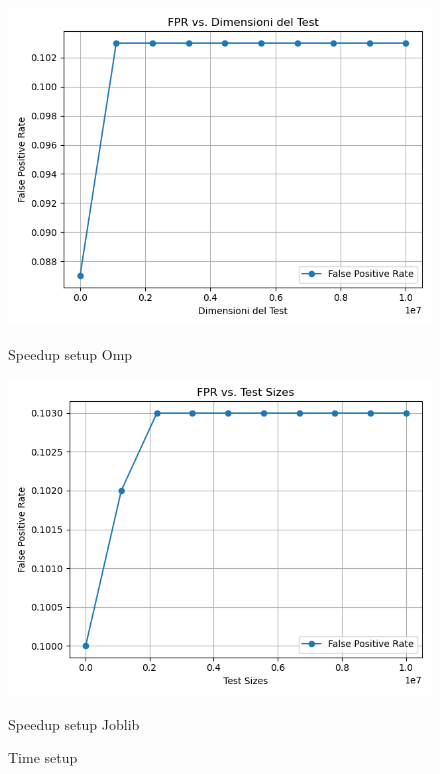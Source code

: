 \documentclass[11pt]{article}
\begin{document}
    \begin{figure}[H]
        \centering
        \includegraphics[width=\linewidth]{omp/010/filter_fpr_plot}
            \caption{Speedup setup Omp}\label{fig:010-filter_fpr_omp}
        \endminipage\hfill
        \includegraphics[width=\linewidth]{joblib/010/filter_fpr_plot}
            \caption{Speedup setup Joblib}\label{fig:010-filter_fpr_joblib}
        \endminipage\hfill
        \caption{Time setup}
    \end{figure}
\end{document}
